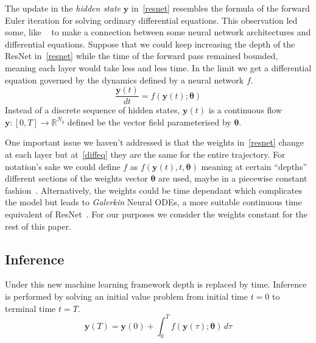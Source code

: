\documentclass[11pt]{article}
\begin{document}
    The update in the \textit{hidden state} $\pmb{y}$ in~\eqref{resnet} resembles the formula of the forward Euler iteration for solving ordinary differential equations.
    This observation led some, like ~\cite{lu2018beyond,weinan2018mean,ruthotto2020deep} to make a connection between some neural network architectures and differential equations.
    Suppose that we could keep increasing the depth of the ResNet in~\eqref{resnet} while the time of the forward pass remained bounded, meaning each layer would take less and less time.
    In the limit we get a differential equation governed by the dynamics defined by a neural network $f$.
    \begin{equation}
        \frac{ \pmb{y}(t)}{dt} = f(\pmb{y}(t); \pmb{\theta}) \label{diffeq}
    \end{equation}
    Instead of a discrete sequence of hidden states, $\pmb{y}(t)$ is a continuous flow $\pmb{y} : [0,T] \to \mathbb{R}^{N_y}$ defined be the vector field parameterised by $\pmb{\theta}$.

    One important issue we haven't addressed is that the weights in~\eqref{resnet} change at each layer but at~\eqref{diffeq} they are the same for the entire trajectory.
    For notation’s sake we could define $f$ as $f(\pmb{y}(t), t, \pmb{\theta})$ meaning at certain ``depths'' different sections of the weights vector $\pmb{\theta}$ are used, maybe in a piecewise constant fashion~\cite{kidger2022neural}.
    Alternatively, the weights could be time dependant which complicates the model but leads to \textit{Galerkin} Neural ODEs, a more suitable continuous time equivalent of ResNet~\cite{massaroli2020dissecting}.
    For our purposes we consider the weights constant for the rest of this paper.

    \subsection{Inference}
    Under this new machine learning framework depth is replaced by time.
    Inference is performed by solving an initial value problem from initial time $t=0$ to terminal time $t=T$.
    \begin{equation}
        \pmb{y}(T) = \pmb{y}(0) + \int_{0}^{T} f(\pmb{y}(\tau); \pmb{\theta}) \, d\tau \label{ivp}
    \end{equation}
\end{document}
